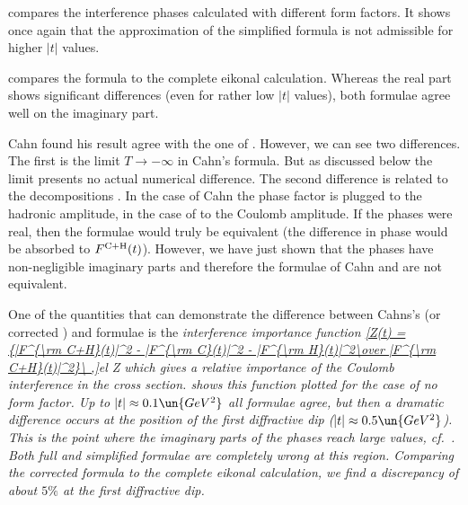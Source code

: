  compares the interference phases calculated with different form factors. It shows once again that the approximation of the simplified \WaY{} formula is not admissible for higher $|t|$ values.

 compares the \KL{} formula to the complete eikonal calculation. Whereas the real part shows significant differences (even for rather low $|t|$ values), both formulae agree well on the imaginary part.

Cahn found his result  agree with the one of \WY{} . However, we can see two differences. The first is the limit $T\to -\infty$ in Cahn's formula. But as discussed below  the limit presents no actual numerical difference. The second difference is related to the decompositions . In the case of Cahn the phase factor is plugged to the hadronic amplitude, in the case of \WaY{} to the Coulomb amplitude. If the phases were real, then the formulae would truly be equivalent (the difference in phase would be absorbed to $F^{\rm C+H}(t)$). However, we have just shown that the phases have non-negligible imaginary parts and therefore the formulae of Cahn  and \WY{}  are not equivalent.

One of the quantities that can demonstrate the difference between Cahns's (or corrected \KL) and \WY{} formulae is the \em{interference importance} function
\eqref{Z(t) = {|F^{\rm C+H}(t)|^2 - |F^{\rm C}(t)|^2 - |F^{\rm H}(t)|^2\over |F^{\rm C+H}(t)|^2}\ ,}{el Z}
which gives a relative importance of the Coulomb interference in the cross section.  shows this function plotted for the case of no form factor. Up to $|t| \approx 0.1\un{GeV^2}$ all formulae agree, but then a dramatic difference occurs at the position of the first diffractive dip ($|t|\approx 0.5\un{GeV^2}$). This is the point where the imaginary parts of the phases reach large values, cf.~. Both full and simplified \WY{} formulae are completely wrong at this region. Comparing the corrected \KL{} formula to the complete eikonal calculation, we find a discrepancy of about $5\percent$ at the first diffractive dip.


